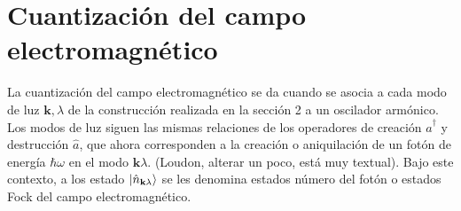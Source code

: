 \section{Cuantización del campo electromagnético}

La cuantización del campo electromagnético se da cuando se asocia a cada modo de luz $\mathbf{k},\lambda$ de la construcción realizada en la sección 2 a un oscilador armónico. Los modos de luz siguen las mismas relaciones de los operadores de creación $\hat{a}^{\dagger}$ y destrucción $\hat{a}$, que ahora corresponden a la creación o aniquilación de un fotón de energía $\hbar\omega$ en el modo $\mathbf{k}\lambda$. (Loudon, alterar un poco, está muy textual). Bajo este contexto, a los estado $\ket{\hat{n}_{\mathbf{k}\lambda}}$ se les denomina estados número del fotón o estados Fock del campo electromagnético.

